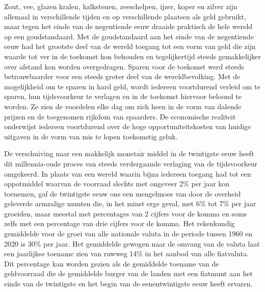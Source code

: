 Zout, vee, glazen kralen, kalkstenen, zeeschelpen, ijzer, koper en zilver zijn allemaal in verschillende tijden en op verschillende plaatsen als geld gebruikt, maar tegen het einde van de negentiende eeuw draaide praktisch de hele wereld op een goudstandaard. Met de goudstandaard aan het einde van de negentiende eeuw had het grootste deel van de wereld toegang tot een vorm van geld die zijn waarde tot ver in de toekomst kon behouden en tegelijkertijd steeds gemakkelijker over afstand kon worden overgedragen. Sparen voor de toekomst werd steeds betrouwbaarder voor een steeds groter deel van de wereldbevolking. Met de mogelijkheid om te sparen in hard geld, wordt iedereen voortdurend verleid om te sparen, hun tijdsvoorkeur te verlagen en in de toekomst hiervoor beloond te worden. Ze zien de voordelen elke dag om zich heen in de vorm van dalende prijzen en de toegenomen rijkdom van spaarders. De economische realiteit onderwijst iedereen voortdurend over de hoge opportuniteitskosten van huidige uitgaven in de vorm van mis te lopen toekomstig geluk.

De verschuiving naar een makkelijk monetair middel in de twintigste eeuw heeft dit millennia-oude proces van steeds verdergaande verlaging van de tijdsvoorkeur omgekeerd. In plaats van een wereld waarin bijna iedereen toegang had tot een oppotmiddel waarvan de voorraad slechts met ongeveer 2\% per jaar kon toenemen, gaf de twintigste eeuw ons een mengelmoes van door de overheid geleverde armzalige munten die, in het minst erge geval, met 6\% tot 7\% per jaar groeiden, maar meestal met percentages van 2 cijfers voor de komma en soms zelfs met een percentage van drie cijfers voor de komma. Het rekenkundig gemiddelde voor de groei van alle nationale valuta in de periode tussen 1960 en 2020 is 30\% per jaar. Het gemiddelde gewogen naar de omvang van de valuta laat een jaarlijkse toename zien van ruwweg 14\% in het aanbod van alle fiatvaluta. Dit percentage kan worden gezien als de gemiddelde toename van de geldvoorraad die de gemiddelde burger van de landen met een fiatmunt aan het einde van de twintigste en het begin van de eenentwintigste eeuw heeft ervaren.\autocite{150}

